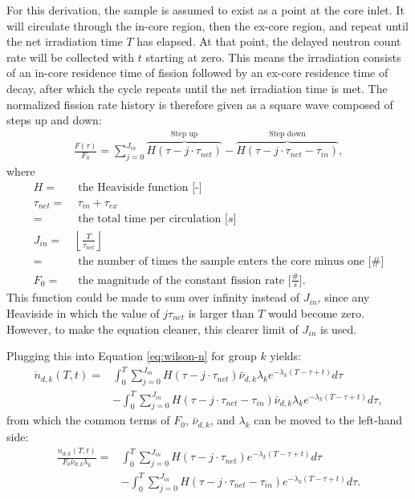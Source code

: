 For this derivation, the sample is assumed to exist as a point at the core inlet.
It will circulate through the in-core region, then the ex-core region, and repeat until the net irradiation time $T$ has elapsed.
At that point, the delayed neutron count rate will be collected with $t$ starting at zero.
This means the irradiation consists of an in-core residence time of fission followed by an ex-core residence time of decay, after which the cycle repeats until the net irradiation time is met.
The normalized fission rate history is therefore given as a square wave composed of steps up and down:
\begin{align}
    \frac{F(\tau)}{F_0} = \sum_{j=0}^{J_{in}} \overbrace{H(\tau - j\cdot \tau_{net})}^\text{Step up} - \overbrace{H(\tau - j \cdot\tau_{net} -\tau_{in})}^\text{Step down},
    \label{eq:pos-square}
\end{align}
where
\begin{align}
    H =& \text{ the Heaviside function [-]} \nonumber \\
    \tau_{net} =& \;\tau_{in} + \tau_{ex} \nonumber \\
    =& \text{ the total time per circulation [$s$]} \nonumber \\
    J_{in} =& \left\lfloor \frac{T}{\tau_{net}} \right\rfloor \nonumber \\
     =& \text{ the number of times the sample enters the core minus one [$\#$]} \nonumber \\
    F_0 =& \text{ the magnitude of the constant fission rate [$\frac{\#}{s}$].} \nonumber
\end{align}
This function could be made to sum over infinity instead of $J_{in}$, since any Heaviside in which the value of $j \tau_{net}$ is larger than $T$ would become zero.
However, to make the equation cleaner, this clearer limit of $J_{in}$ is used.

Plugging this into Equation \eqref{eq:wilson-n} for group $k$ yields:
\begin{align}
\dot{n}_{d, k}(T, t) =& \int_{0}^{T} \sum_{j=0}^{J_{in}} H(\tau - j\cdot \tau_{net}) \bar{\nu}_{d, k} \lambda_k e^{-\lambda_k (T-\tau+t)} d\tau \nonumber\\
& - \int_{0}^{T} \sum_{j=0}^{J_{in}} H(\tau - j \cdot\tau_{net} - \tau_{in}) \bar{\nu}_{d, k} \lambda_k e^{-\lambda_k (T-\tau+t)} d\tau,
\end{align}
from which the common terms of $F_0$, $\bar{\nu}_{d, k}$, and $\lambda_k$ can be moved to the left-hand side:
\begin{align}
\frac{\dot{n}_{d, k}(T, t)}{F_0 \bar{\nu}_{d, k} \lambda_k} =& \int_{0}^{T} \sum_{j=0}^{J_{in}} H(\tau - j\cdot \tau_{net})   e^{-\lambda_k (T-\tau+t)} d\tau \nonumber\\
& - \int_{0}^{T} \sum_{j=0}^{J_{in}} H(\tau - j \cdot\tau_{net} - \tau_{in}) e^{-\lambda_k (T-\tau+t)} d\tau.
\end{align}

